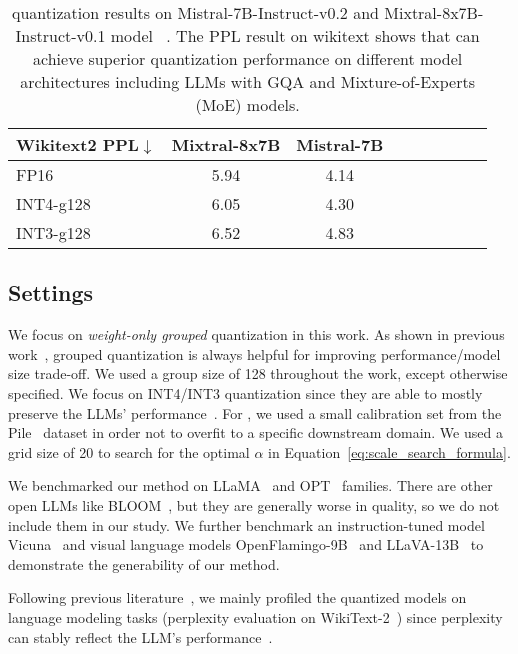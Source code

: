 \begin{table}
    \setlength{\tabcolsep}{5pt}
    \small
    \centering
    \begin{tabular}{lcccccccc}
      \toprule
        \textbf{Wikitext2 PPL}$\downarrow$ & Mixtral-8x7B  & Mistral-7B \\  \midrule
      FP16 & 5.94 & 4.14 \\ \midrule
      INT4-g128 & 6.05 & 4.30	 \\
       INT3-g128 & 6.52 & 4.83  \\
      \bottomrule
    \end{tabular}
    \caption{\methodshort quantization results on Mistral-7B-Instruct-v0.2\cite{jiang2023mistral} and Mixtral-8x7B-Instruct-v0.1 model ~\cite{jiang2024mixtral}. The PPL result on wikitext shows that \methodshort can achieve superior quantization performance on different model architectures including LLMs with GQA and Mixture-of-Experts (MoE) models.}
    \label{tab:opt_ppl}
\end{table}

\subsection{Settings}

 We focus on \emph{weight-only grouped} quantization in this work. As shown in previous work~\cite{dettmers2022case, frantar2022gptq}, grouped quantization is always helpful for improving performance/model size trade-off. We used a group size of 128 throughout the work, except otherwise specified. We focus on INT4/INT3 quantization since they are able to mostly preserve the LLMs' performance~\cite{dettmers2022case}. For \methodshort, we used a small calibration set from the Pile~\cite{gao2020pile} dataset in order not to overfit to a specific downstream domain. We used a grid size of 20 to search for the optimal $\alpha$ in Equation~\ref{eq:scale_search_formula}. 

 We benchmarked our method on LLaMA~\cite{touvron2023llama} and OPT~\cite{opt} families. There are other open LLMs like BLOOM~\cite{scao2022bloom}, but they are generally worse in quality, so we do not include them in our study. We further benchmark an instruction-tuned model Vicuna~\cite{vicuna2023} and visual language models OpenFlamingo-9B~\cite{openflamingo} and LLaVA-13B~\cite{liu2023llava} to demonstrate the generability of our method. 

 Following previous literature~\cite{dettmers2022llmint8, xiao2022smoothquant, frantar2022gptq, dettmers2022case, zeroquant}, we mainly profiled the quantized models on language modeling tasks (perplexity evaluation on WikiText-2~\cite{merity2016pointer}) since perplexity can stably reflect the LLM's performance~\cite{dettmers2022case}.

